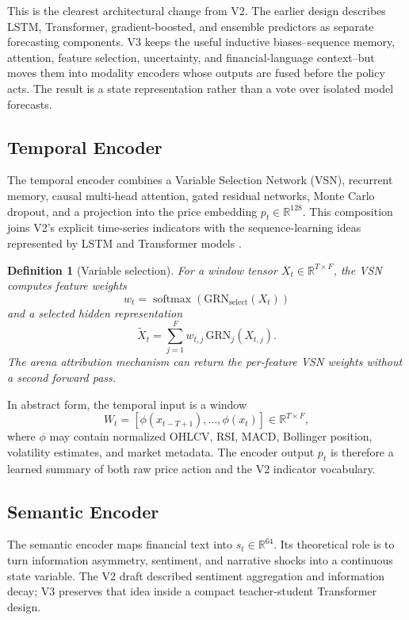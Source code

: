 \documentclass[10pt]{article}
\newtheorem{definition}{Definition}[section]
\newcommand{\R}{\mathbb{R}}
\newcommand{\softmax}{\operatorname{softmax}}
\begin{document}
This is the clearest architectural change from V2. The earlier design describes LSTM,
Transformer, gradient-boosted, and ensemble predictors as separate forecasting components.
V3 keeps the useful inductive biases--sequence memory, attention, feature selection,
uncertainty, and financial-language context--but moves them into modality encoders whose
outputs are fused before the policy acts. The result is a state representation rather than a
vote over isolated model forecasts.

\subsection{Temporal Encoder}

The temporal encoder combines a Variable Selection Network (VSN), recurrent memory, causal
multi-head attention, gated residual networks, Monte Carlo dropout, and a projection into the
price embedding \(p_t\in\R^{128}\). This composition joins V2's explicit time-series
indicators with the sequence-learning ideas represented by LSTM and Transformer models
\cite{hochreiter1997,vaswani2017}.

\begin{definition}[Variable selection]
	For a window tensor \(X_t\in\R^{T\times F}\), the VSN computes feature weights
	\[
		w_t = \softmax(\mathrm{GRN}_{\mathrm{select}}(X_t))
	\]
	and a selected hidden representation
	\[
		\widetilde{X}_t
		=
		\sum_{j=1}^{F} w_{t,j}\,\mathrm{GRN}_{j}(X_{t,j}).
	\]
	The arena attribution mechanism can return the per-feature VSN weights without a second forward
	pass.
\end{definition}

In abstract form, the temporal input is a window
\[
	W_t = [\phi(x_{t-T+1}),\ldots,\phi(x_t)]\in\R^{T\times F},
\]
where \(\phi\) may contain normalized OHLCV, RSI, MACD, Bollinger position, volatility
estimates, and market metadata. The encoder output \(p_t\) is therefore a learned summary of
both raw price action and the V2 indicator vocabulary.

\subsection{Semantic Encoder}

The semantic encoder maps financial text into \(s_t\in\R^{64}\). Its theoretical role is to
turn information asymmetry, sentiment, and narrative shocks into a continuous state variable.
The V2 draft described sentiment aggregation and information decay; V3 preserves that idea
inside a compact teacher-student Transformer design.
\end{document}
